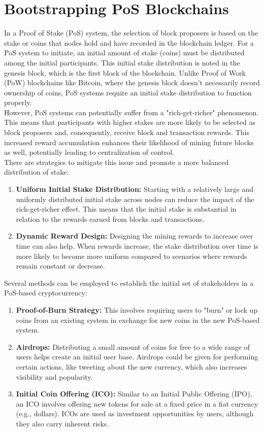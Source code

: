 \documentclass{report}
\begin{document}
\section{Bootstrapping PoS Blockchains}
In a Proof of Stake (PoS) system, the selection of block proposers is based on the stake or coins that nodes hold and have recorded in the blockchain ledger. For a PoS system to initiate, an initial amount of stake (coins) must be distributed among the initial participants. This initial stake distribution is noted in the genesis block, which is the first block of the blockchain. Unlike Proof of Work (PoW) blockchains like Bitcoin, where the genesis block doesn't necessarily record ownership of coins, PoS systems require an initial stake distribution to function properly.\\
However, PoS systems can potentially suffer from a "rich-get-richer" phenomenon. This means that participants with higher stakes are more likely to be selected as block proposers and, consequently, receive block and transaction rewards. This increased reward accumulation enhances their likelihood of mining future blocks as well, potentially leading to centralization of control.\\
There are strategies to mitigate this issue and promote a more balanced distribution of stake:
\begin{enumerate}
	\item \textbf{Uniform Initial Stake Distribution:} Starting with a relatively large and uniformly distributed initial stake across nodes can reduce the impact of the rich-get-richer effect. This means that the initial stake is substantial in relation to the rewards earned from blocks and transactions.
	\item \textbf{Dynamic Reward Design:} Designing the mining rewards to increase over time can also help. When rewards increase, the stake distribution over time is more likely to become more uniform compared to scenarios where rewards remain constant or decrease.
\end{enumerate}
Several methods can be employed to establish the initial set of stakeholders in a PoS-based cryptocurrency:
\begin{enumerate}
	\item \textbf{Proof-of-Burn Strategy:} This involves requiring users to "burn" or lock up coins from an existing system in exchange for new coins in the new PoS-based system.
	\item \textbf{Airdrops:} Distributing a small amount of coins for free to a wide range of users helps create an initial user base. Airdrops could be given for performing certain actions, like tweeting about the new currency, which also increases visibility and popularity.
	\item \textbf{Initial Coin Offering (ICO):} Similar to an Initial Public Offering (IPO), an ICO involves offering new tokens for sale at a fixed price in a fiat currency (e.g., dollars). ICOs are used as investment opportunities by users, although they also carry inherent risks.
\end{enumerate}
\end{document}
